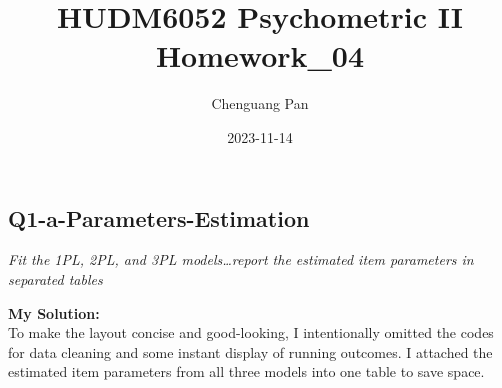 \documentclass[
]{article}
\title{HUDM6052 Psychometric II Homework\_04}
\author{Chenguang Pan}
\date{2023-11-14}
\begin{document}
\maketitle

\setcounter{tocdepth}{4}
\tableofcontents

\hypertarget{q1-a-parameters-estimation}{%
\subsection{Q1-a-Parameters-Estimation}\label{q1-a-parameters-estimation}}

\emph{Fit the 1PL, 2PL, and 3PL models\ldots report the estimated item
parameters in separated tables}

\textbf{My Solution:}\\
To make the layout concise and good-looking, I intentionally omitted the
codes for data cleaning and some instant display of running outcomes. I
attached the estimated item parameters from all three models into one
table to save space.
\end{document}
